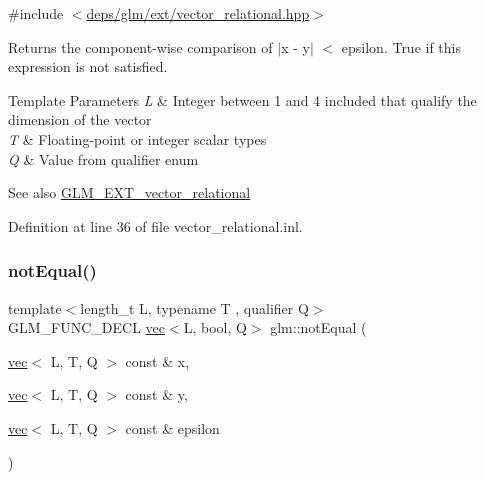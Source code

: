{\ttfamily \#include $<$\hyperlink{ext_2vector__relational_8hpp}{deps/glm/ext/vector\+\_\+relational.\+hpp}$>$}

Returns the component-\/wise comparison of $\vert$x -\/ y$\vert$ $<$ epsilon. True if this expression is not satisfied.


\begin{DoxyTemplParams}{Template Parameters}
{\em L} & Integer between 1 and 4 included that qualify the dimension of the vector \\
\hline
{\em T} & Floating-\/point or integer scalar types \\
\hline
{\em Q} & Value from qualifier enum\\
\hline
\end{DoxyTemplParams}
\begin{DoxySeeAlso}{See also}
\hyperlink{group__ext__vector__relational}{G\+L\+M\+\_\+\+E\+X\+T\+\_\+vector\+\_\+relational} 
\end{DoxySeeAlso}


Definition at line 36 of file vector\+\_\+relational.\+inl.

\mbox{\label{group__ext__vector__relational_ga0497a636e5e8140bb7ebc021baf86637}} 
\subsubsection{\texorpdfstring{not\+Equal()}{notEqual()}\hspace{0.1cm}{\footnotesize\ttfamily [2/3]}}
{\footnotesize\ttfamily template$<$length\+\_\+t L, typename T , qualifier Q$>$ \\
G\+L\+M\+\_\+\+F\+U\+N\+C\+\_\+\+D\+E\+CL \hyperlink{structglm_1_1vec}{vec}$<$L, bool, Q$>$ glm\+::not\+Equal (\begin{DoxyParamCaption}\item[{\hyperlink{structglm_1_1vec}{vec}$<$ L, T, Q $>$ const \&}]{x,  }\item[{\hyperlink{structglm_1_1vec}{vec}$<$ L, T, Q $>$ const \&}]{y,  }\item[{\hyperlink{structglm_1_1vec}{vec}$<$ L, T, Q $>$ const \&}]{epsilon }\end{DoxyParamCaption})}



